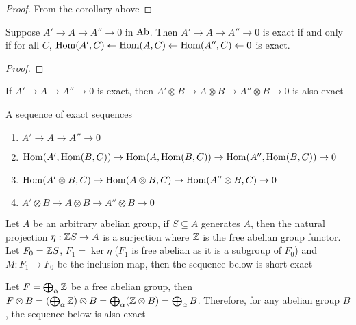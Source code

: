 \documentclass{report}
\begin{document}
\begin{proof}
    From the corollary above
\end{proof}

\begin{lemma}
    Suppose $A' \to A \to A'' \to 0$ in $\Ab$. Then $A' \to A \to A'' \to 0$ is exact if and only if for all $C$, $\Hom(A', C) \leftarrow \Hom(A, C) \leftarrow \Hom(A'', C) \leftarrow 0$ is exact.
\end{lemma}

\begin{proof}
\end{proof}

\begin{corollary}
    If $A' \to A \to A'' \to 0$ is exact, then $A' \otimes B \to A \otimes B \to A'' \otimes B \to 0$ is also exact
\end{corollary}

\begin{longproof}
    A sequence of exact sequences
    \begin{enumerate}
        \item $A' \to A \to A'' \to 0$
        \item $\Hom(A', \Hom(B, C)) \to \Hom(A, \Hom(B, C)) \to \Hom(A'', \Hom(B, C)) \to 0$
        \item $\Hom(A' \otimes B, C) \to \Hom(A\otimes B, C) \to \Hom(A''\otimes B, C) \to 0$
        \item $A' \otimes B \to A \otimes B \to A'' \otimes B \to 0$
    \end{enumerate}
\end{longproof}

\begin{proposition}
Let $A$ be an arbitrary abelian group, if $S \subseteq A$ generates $A$, then the natural projection $\eta: \Z S \to A$ is a surjection where $\Z$ is the free abelian group functor. Let $F_0 = \Z S$, $F_1 = \ker \eta$ ($F_1$ is free abelian as it is a subgroup of $F_0$) and $M: F_1 \to F_0$ be the inclusion map, then the sequence below is short exact

\begin{center}
\end{center}

Let $F = \bigoplus_\alpha \Z$ be a free abelian group, then $ F \otimes B = \tuple*{\bigoplus_\alpha \Z} \otimes B = \bigoplus_\alpha (\Z \otimes B) = \bigoplus_\alpha B$. 
Therefore, for any abelian group $B$, the sequence below is also exact
\begin{center}
\end{center}

\end{proposition}
\end{document}
